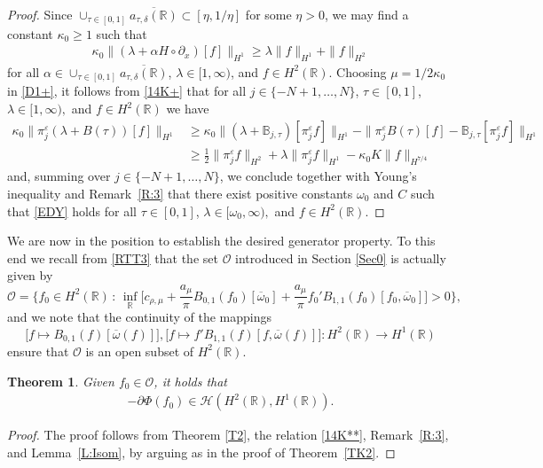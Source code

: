 \documentclass[11pt,reqno]{amsart}
\numberwithin{equation}{section}
\newcommand{\0}{\Omega}
\newcommand{\e}{\varepsilon}
\newcommand{\p}{\partial}
\newcommand{\ov}{\overline}
\newcommand{\oo}{\ov\omega}
\newcommand{\bB}{\mathbb{B}}
\newcommand{\cO}{\mathcal{O}}
\newcommand{\kH}{\mathcal{H}}
\newcommand{\R}{\mathbb{R}}
\newtheorem{thm}{Theorem}[section]
\numberwithin{equation}{section}
\begin{document}
\begin{proof}
 Since   $\cup_{\tau\in[0,1]} \overline{a_{\tau,\delta}(\R)}\subset[\eta,1/\eta]$ for some $\eta>0$, we may find a constant  $\kappa_0\geq1$  such that  
  \begin{align}
\label{14K+}
\kappa_0\|(\lambda+\alpha H\circ \p_x)[f]\|_{H^1}\geq  \lambda\|f\|_{H^1}+    \|f\|_{H^2}
\end{align}
for all $\alpha\in \cup_{\tau\in[0,1]} \overline{a_{\tau,\delta}(\R)}$,    $\lambda\in [1,\infty)$, and $f\in H^2(\R)$.
Choosing $\mu=1/2\kappa_0$ in \eqref{D1+}, it follows from \eqref{14K+} that for all $j\in\{-N+1,\ldots,N\}$, $\tau\in[0,1]$, $\lambda\in[1,\infty),$ and $f\in H^2(\R)$ we have
 \begin{align*}
  \kappa_0 \|\pi_j^\e (\lambda+B(\tau)) [ f]\|_{H^1}&\geq \kappa_0\|(\lambda+\bB_{j,\tau})[\pi^\e_j f]\|_{H^1}-   \|\pi_j^\e B(\tau) [ f]-\bB_{j,\tau}[\pi^\e_j f]\|_{H^1}\\[1ex]
  &\geq \frac{1}{2 } \|\pi_j^\e f\|_{H^2}+\lambda\|\pi_j^\e f\|_{H^1}-\kappa_0K\|  f\|_{H^{7/4}}
 \end{align*}
and, summing over $j\in\{-N+1,\ldots,N\}$,  we conclude together with Young's inequality and Remark~\ref{R:3}   that there exist positive constants $\omega_0$ and $C$ such that \eqref{EDY} holds for all
$\tau\in[0,1]$, $\lambda\in[\omega_0,\infty),$ and $f\in H^2(\R)$.
\end{proof}

We are now in the position to establish the desired generator property.
To this end we recall from \eqref{RTT3} that  the set $\cO$ introduced  in Section \ref{Sec0} is actually given by
\[
\cO=\Big\{f_0\in H^2(\R)\,:\, \inf_\R \Big[c_{\rho,\mu} +\frac{a_\mu}{\pi }B_{0,1}(f_0)[\oo_0] +\frac{a_\mu}{\pi }f_0'B_{1,1}(f_0)[f_0,\oo_0]\Big]>0\Big\},
\]
and we note that the continuity of the mappings 
\[\big[f\mapsto  B_{0,1}(f)[\oo(f)]\big],\big[f\mapsto f'B_{1,1}(f)[f,\oo(f)]\big]:H^2(\R)\to H^1(\R)\] 
ensure that $\cO$ is an open subset of $H^2(\R).$

\begin{thm}\label{TK3}
Given $f_0\in \cO$, it holds that  
 \begin{align*} 
  -\p\Phi(f_0)\in \kH(H^2(\R), H^1(\R)).
 \end{align*}
\end{thm}
\begin{proof}
 The proof follows from Theorem \ref{T2}, the relation \eqref{14K**}, Remark~\ref{R:3}, and Lemma~\ref{L:Isom}, by arguing as in the proof of Theorem~\ref{TK2}.
\end{proof}
 
\end{document}
